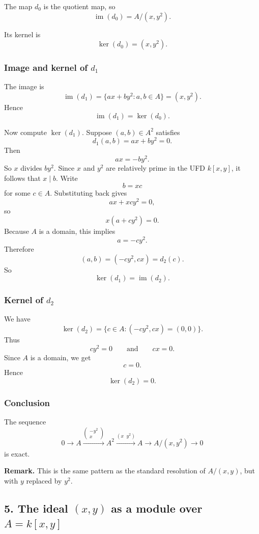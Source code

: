 \documentclass[12pt,a4paper]{article}
\theoremstyle{notespace}
\theoremstyle{definition}
\begin{document}
The map \(d_0\) is the quotient map, so
\[
\operatorname{im}(d_0)=A/(x,y^2).
\]

Its kernel is
\[
\ker(d_0)=(x,y^2).
\]

\subsubsection*{Image and kernel of \(d_1\)}

The image is
\[
\operatorname{im}(d_1)=\{ax+by^2 : a,b\in A\}=(x,y^2).
\]
Hence
\[
\operatorname{im}(d_1)=\ker(d_0).
\]

Now compute \(\ker(d_1)\).
Suppose \((a,b)\in A^2\) satisfies
\[
d_1(a,b)=ax+by^2=0.
\]
Then
\[
ax=-by^2.
\]
So \(x\) divides \(by^2\).
Since \(x\) and \(y^2\) are relatively prime in the UFD \(k[x,y]\), it follows that \(x\mid b\).
Write
\[
b=xc
\]
for some \(c\in A\).
Substituting back gives
\[
ax+xcy^2=0,
\]
so
\[
x(a+cy^2)=0.
\]
Because \(A\) is a domain, this implies
\[
a=-cy^2.
\]
Therefore
\[
(a,b)=(-cy^2,cx)=d_2(c).
\]
So
\[
\ker(d_1)=\operatorname{im}(d_2).
\]

\subsubsection*{Kernel of \(d_2\)}

We have
\[
\ker(d_2)=\{c\in A : (-cy^2,cx)=(0,0)\}.
\]
Thus
\[
cy^2=0
\qquad\text{and}\qquad
cx=0.
\]
Since \(A\) is a domain, we get
\[
c=0.
\]
Hence
\[
\ker(d_2)=0.
\]

\subsubsection*{Conclusion}

The sequence
\[
0 \longrightarrow A \xrightarrow{\begin{pmatrix}-y^2\\x\end{pmatrix}} A^2
\xrightarrow{(x\;\;y^2)} A \longrightarrow A/(x,y^2) \longrightarrow 0
\]
is exact.

\medskip

\textbf{Remark.}
This is the same pattern as the standard resolution of \(A/(x,y)\), but with \(y\) replaced by \(y^2\).

\subsection{5. The ideal \((x,y)\) as a module over \(A=k[x,y]\)}
\end{document}
